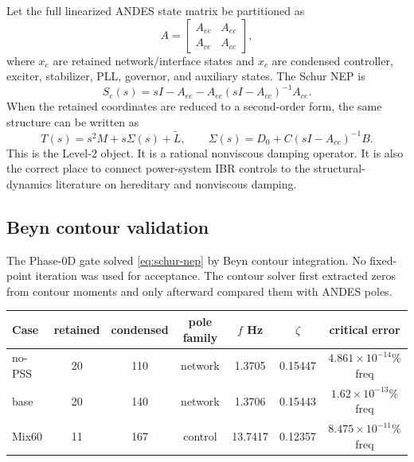 \documentclass[11pt]{article}
\newcommand{\Lt}{\widetilde L}
\begin{document}
Let the full linearized ANDES state matrix be partitioned as
\begin{equation}
  A=
  \begin{bmatrix}
  A_{ee} & A_{ec}\\
  A_{ce} & A_{cc}
  \end{bmatrix},
  \label{eq:schur-partition}
\end{equation}
where $x_e$ are retained network/interface states and $x_c$ are condensed
controller, exciter, stabilizer, PLL, governor, and auxiliary states. The
Schur NEP is
\begin{equation}
  S_e(s)=sI-A_{ee}-A_{ec}(sI-A_{cc})^{-1}A_{ce}.
  \label{eq:schur-nep}
\end{equation}
When the retained coordinates are reduced to a second-order form, the same
structure can be written as
\begin{equation}
  T(s)=s^2M+s\Sigma(s)+\Lt,\qquad
  \Sigma(s)=D_0+C(sI-A_{cc})^{-1}B.
  \label{eq:rational-self-energy}
\end{equation}
This is the Level-2 object. It is a rational nonviscous damping operator.
It is also the correct place to connect power-system IBR controls to the
structural-dynamics literature on hereditary and nonviscous damping.

\subsection{Beyn contour validation}

The Phase-0D gate solved \eqref{eq:schur-nep} by Beyn contour integration.
No fixed-point iteration was used for acceptance. The contour solver first
extracted zeros from contour moments and only afterward compared them with
ANDES poles.

\begin{center}
\small
\begin{tabular}{lcccccc}
\toprule
Case & retained & condensed & pole family & $f$ Hz & $\zeta$ & critical error\\
\midrule
no-PSS & 20 & 110 & network & 1.3705 & 0.15447 & $4.861\times10^{-14}\%$ freq\\
base & 20 & 140 & network & 1.3706 & 0.15443 & $1.62\times10^{-13}\%$ freq\\
Mix60 & 11 & 167 & control & 13.7417 & 0.12357 & $8.475\times10^{-11}\%$ freq\\
\bottomrule
\end{tabular}
\end{center}
\end{document}
